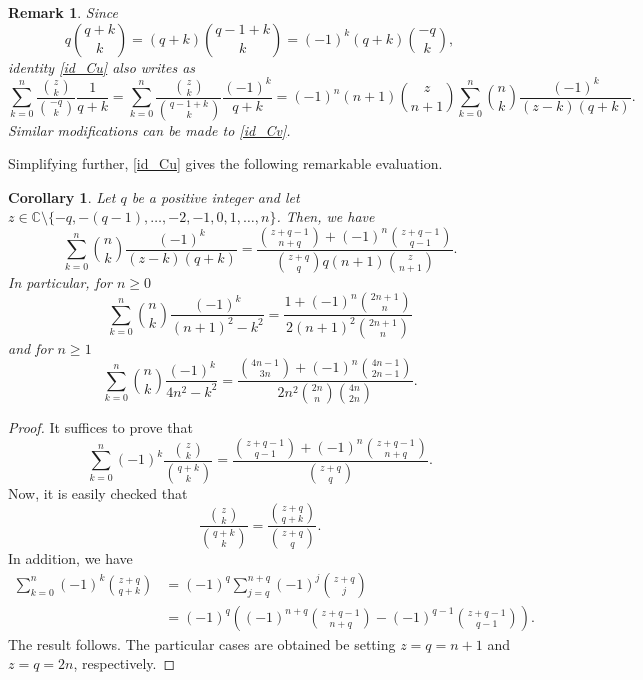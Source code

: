 \documentclass[11pt,reqno]{amsart}
\theoremstyle{plain}
\numberwithin{equation}{section}
\newtheorem{corollary}[thm]{Corollary}
\newtheorem{remark}[thm]{Remark}
\begin{document}
\begin{remark}
Since 
$$q\binom{q+k}{k} = (q+k)\binom{q-1+k}{k} = (-1)^k(q+k)\binom{-q}{k},$$
identity \eqref{id_Cu} also writes as 
\begin{equation}\label{id_Cw} 
\sum_{k=0}^n \frac{\binom{z}{k}}{\binom{-q}{k}}\frac{1}{q+k}=\sum_{k=0}^n \frac{\binom{z}{k}}{\binom{q-1+k}{k}}\frac{(-1)^k}{q+k}=
 (-1)^n (n+1) \binom{z}{n+1} \sum_{k=0}^n \binom{n}{k} \frac{(-1)^k}{(z-k)(q+k)}.
\end{equation}
Similar modifications can be made to \eqref{id_Cv}.
\end{remark}

Simplifying further, \eqref{id_Cu} gives the following remarkable evaluation.

\begin{corollary}
Let $q$ be a positive integer and let $z\in\mathbb{C}\setminus\{-q,-(q-1),\ldots,-2,-1,0,1,\ldots,n\}$. Then, we have
\begin{equation}\label{id_Ce}
\sum_{k=0}^n\binom{n}{k}\frac{(-1)^k}{(z-k)(q+k)}=\frac{\binom{z+q-1}{n+q}+(-1)^n\binom{z+q-1}{q-1}}{\binom{z+q}{q} q(n+1)\binom{z}{n+1}}.
\end{equation}
In particular, for $n\geq 0$
$$\sum_{k=0}^n \binom{n}{k} \frac{(-1)^{k}}{(n+1)^2-k^2} = \frac{1+(-1)^n\binom{2n+1}{n}}{2(n+1)^2\binom{2n+1}{n}}$$
and for $n\geq 1$
$$\sum_{k=0}^n \binom{n}{k} \frac{(-1)^{k}}{4n^2-k^2} = \frac{\binom{4n-1}{3n}+(-1)^n\binom{4n-1}{2n-1}}{2 n^2 \binom{2n}{n}\binom{4n}{2n}}.$$
\end{corollary}
\begin{proof}
It suffices to prove that
\begin{equation}\label{id_Cf}
\sum_{k=0}^n(-1)^k\frac{\binom{z}{k}}{\binom{q+k}{k}}=\frac{\binom{z+q-1}{q-1}+(-1)^n\binom{z+q-1}{n+q}}{\binom{z+q}{q}}.
\end{equation}
Now, it is easily checked that 
\[\frac{\binom{z}{k}}{\binom{q+k}{k}} = \frac{\binom{z+q}{q+k}}{\binom{z+q}{q}}.\]
In addition, we have
\begin{align*}
\sum_{k=0}^n (-1)^k \binom{z+q}{q+k} &= (-1)^q\sum_{j=q}^{n+q}(-1)^j\binom{z+q}{j} \\
&= (-1)^q\left((-1)^{n+q}\binom{z+q-1}{n+q}-(-1)^{q-1}\binom{z+q-1}{q-1}\right).
\end{align*}
The result follows. The particular cases are obtained be setting $z=q=n+1$ and $z=q=2n$, respectively.
\end{proof}
\end{document}
